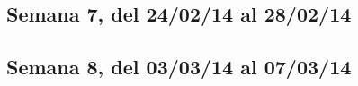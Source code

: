 \documentclass[11pt,oneside,titlepage]{article}
\begin{document}
\subsection*{Semana 7, del 24/02/14 al 28/02/14}
\begin{comment}

lunes
- Se decide por comprar la tarjeta desarrollo USB33880 , Claudio Torres no
escucha nuestras advertencias de que hay que realizar el driver completamente y
aún asi decide comprarla. Francisco nos pide que le mandemos el valor para que
la Universidad realice la compra, el producto no es disponible. Mantemos al
tanto a Torres sobre el problema, no sabemos que hacer.  Por mientras cada uno
hace lo suyo.

martes
- Se envía correo preguntado por el stock, efectivamente hay y los problemas son de la página web. La respuesta fue que intentaramos de nuevo y si teníamos problemas que avisaramos. La página tiene problemas y ya dimos el aviso, estamos a la espera.

miercoles
- Nos informan que no hay stock de la tarjeta  USB3380-AB EVK-RC pero si el pedido es muy urgente, y lo es, no darán el contacto con la empresa que fabrica este dispositivo. Estamos a la espera del correo con el contacto.
JUEVES
- Nos informan que existe stock en otra tienda de china, el problema que para comprar es necesario tener un número de telefono de China. Envíamos un correo preguntando por ayuda.
VIERNES
- No respondieron el correo y efectivamente hay stcok. Ya envíamos el correo a Francisco para que se realice la compra. 
\end{comment}

\subsection*{Semana 8, del 03/03/14 al 07/03/14}

\begin{comment}
LUNES
- Aún no se compra el dispositivo. 
- Reunion con el profesor Claudio Torres. Se definiero el trabajo a realizar durante la semana. Se realizaŕa una informe final describiendo todo el trabajo realizado hasta el momento.
MARTES
- Comienzo de la escritura del informe final. Estructura del informe.
MIERCOLES
- Seguimos con el informe. 
- Se investiga posibilidad de comprar un adaptador AC pequeño.
JUEVES
- Seguimos con el informe.
- Recibi correo de loley, todo el software necesario para el desarrollo del USB3380 está en la página.
VIERNES
- Término del informe final y reunión informativa con March.
- Se compra USB3380. 
- Se decice comprar el mini computador, ahora se busca nuevas fuentes de poder pequeñas para ahorrar espacio.
- Revision del informe, se arreglan detalles y resultó todo bien.
\end{comment}
\end{document}
